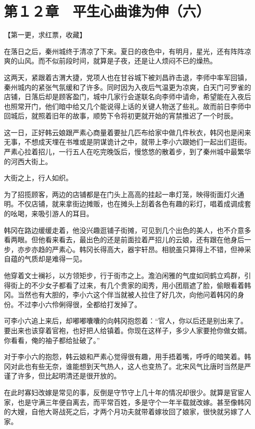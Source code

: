 \section{第１２章　平生心曲谁为伸（六）}

【第一更，求红票，收藏】

在落日之后，秦州城终于清凉了下来。夏日的夜色中，有明月，星光，还有阵阵凉爽的山风。而不似前段时间，就算是子夜，还是让人烦闷不已的燥热。

这两天，紧跟着古渭大捷，党项人也在甘谷城下被刘昌祚击退，李师中率军回镇，秦州城内的紧张气氛缓和了许多。同时因为入夜后气温更为凉爽，白天门可罗雀的店铺，日落后却是顾客盈门，城中几家行会遂联名向李师中请命，希望能在入夜后也照常开门，他们暗中给又几个能说得上话的关键人物送了些礼。故而前日李师中回城后，就照着旧年的故事，顺势下令将初更就开始的宵禁推迟了一个时辰。

这一日，正好韩云娘跟严素心商量着要扯几匹布给家中做几件秋衣，韩冈也是闲来无事，不想成天埋在书堆或是阴谋诡计之中，就带上李小六跟她们一起出们逛街。严素心拉着招儿，一行五人在吃完晚饭后，慢悠悠的散着步，到了秦州城中最繁华的河西大街上。

大街之上，行人如织。

为了招揽顾客，两边的店铺都是在门头上高高的挂起一串灯笼，映得街面灯火通明。不仅店铺，就来拿街边摊贩，也在摊头上刮着各色有趣的彩灯，唱着成调成套的吆喝，来吸引游人的耳目。

韩冈在路边缓缓走着，他没兴趣逛铺子街摊，可见到几个出色的美人，也不介意多看两眼。但他看来看去，最出色的还是前面拉着严招儿的云娘，还有跟在他身后一步，亦步亦趋的严素心。韩冈长得高大，器宇轩昂。相貌虽只算得上不错，但神采自蕴的气质却是难得一见。

他穿着文士襕衫，以方领矩步，行于街市之上。澹泊闲雅的气度如同鹤立鸡群，引得街上的不少女子都看了过来，有几个贵家的闺秀，用小团扇遮了脸，偷眼看着韩冈。当然也有大胆的，李小六这个伴当就被人拉住了好几次，向他问着韩冈的身份。不过李小六伶俐得很，全都给打发掉了。

可李小六追上来后，却嘟嘟囔囔的向韩冈抱怨着：“官人，你以后还是别出来了。要出来也该穿着官袍，也好把人给镇着。你现在这样子，多少人家要抢你做女婿。你看看，俺的袖子都给扯破了。”

对于李小六的抱怨，韩云娘和严素心觉得很有趣，用手捂着嘴，呼呼的暗笑着。韩冈对此也有些无奈，谁能想到天气热人，这人也变热了。北宋风气比唐时当然是严谨了许多，但比起明清还是很开放的。

在此时寡妇改嫁是常见的事，反倒是守节守上几十年的情况却很少。就算是官宦人家，也是守满三年便自离去，而平常百姓，多是守个一年半载就改嫁。甚至像韩冈的大嫂，自他大哥战死之后，才两个月功夫就带着嫁妆回了娘家，很快就另嫁了人家。

